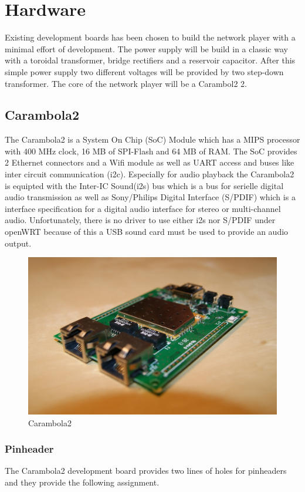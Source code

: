 
\section{Hardware}
Existing development boards has been chosen to build the network player with a minimal  effort of development. The power supply will be build in a classic way with a toroidal transformer, bridge rectifiers and a reservoir capacitor. After this simple power supply two different voltages will be provided by two step-down transformer. The core of the network player will be a Carambol2 2.
\subsection{Carambola2}
The Carambola2 is a System On Chip (SoC) Module which has a MIPS processor with 400 MHz clock, 16 MB of SPI-Flash and 64 MB of RAM. The SoC provides 2 Ethernet connectors and a Wifi module as well as UART access and buses like inter circuit communication (i2c). Especially for audio playback the Carambola2 is equipted with the Inter-IC Sound(i2s) bus which is a bus for serielle digital audio transmission as well as Sony/Philips Digital Interface (S/PDIF) which is a interface specification for a digital audio interface for stereo or multi-channel audio. Unfortunately, there is no driver to use either i2s nor S/PDIF under openWRT because of this a USB sound card must be used to provide an audio output.
\begin{figure}[h!]
\begin{center}
\includegraphics[scale=0.4]{pictures/carambola2}
\caption{Carambola2}
\end{center}
\end{figure}
\subsubsection{Pinheader}
The Carambola2 development board provides two lines of holes for pinheaders and they provide the following assignment.

